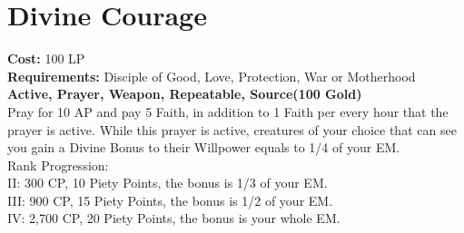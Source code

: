\section{Divine Courage}\label{prayer:divineCourage}
\textbf{Cost:} 100 LP\\
\textbf{Requirements:} Disciple of Good, Love, Protection, War or Motherhood\\
\textbf{Active, Prayer, Weapon, Repeatable, Source(100 Gold)}\\
Pray for 10 AP and pay 5 Faith, in addition to 1 Faith per every hour that the prayer is active.
While this prayer is active, creatures of your choice that can see you gain a Divine Bonus to their Willpower equals to 1/4 of your EM.
\\
Rank Progression:\\
II: 300 CP, 10 Piety Points, the bonus is 1/3 of your EM.\\
III: 900 CP, 15 Piety Points, the bonus is 1/2 of your EM.\\
IV: 2,700 CP, 20 Piety Points, the bonus is your whole EM.\\